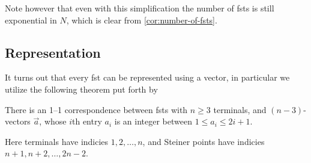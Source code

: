 Note however that even with this simplification the number of \acp{fst} is
still exponential in $N$, which is clear from \cref{cor:number-of-fsts}.

\subsection{Representation}
\label{sec:representation}

It turns out that every \ac{fst} can be represented using a vector, in
particular we utilize the following theorem put forth by \textcite{smith1992}

\begin{theorem}
  There is an 1--1 correspondence between \acp{fst} with $n \ge 3$ terminals,
  and $(n-3)$-vectors $\vec{a}$, whose $i$th entry $a_i$ is an integer between
  $1 \le a_i \le 2 i + 1$.
\end{theorem}

Here terminals have indicies $1, 2, \ldots, n$, and Steiner points have indicies
$n + 1, n + 2, \ldots, 2 n - 2$.

